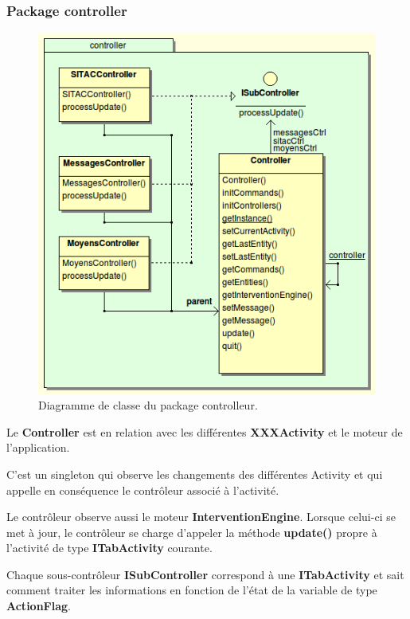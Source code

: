 \documentclass{article}
\begin{document}
\subsubsection{Package controller}
\begin{figure}[htbp]
\begin{center}
\includegraphics[width=350pt]{doc_dev-fig002.png}
\caption{Diagramme de classe du package controlleur.}
\end{center}
\end{figure}


Le \textbf{Controller} est en relation avec les différentes \textbf{XXXActivity} et le moteur de l’application.

C’est un singleton qui observe les changements des différentes Activity et qui appelle en conséquence le contrôleur associé à l'activité.

Le contrôleur observe aussi le moteur \textbf{InterventionEngine}. Lorsque celui-ci se met à jour, le contrôleur se charge d’appeler la méthode \textbf{update()} propre à l'activité de type \textbf{ITabActivity} courante.

Chaque sous-contrôleur \textbf{ISubController} correspond à une \textbf{ITabActivity} et sait comment traiter les informations en fonction de l’état de la variable de type \textbf{ActionFlag}.
\newpage
\end{document}
